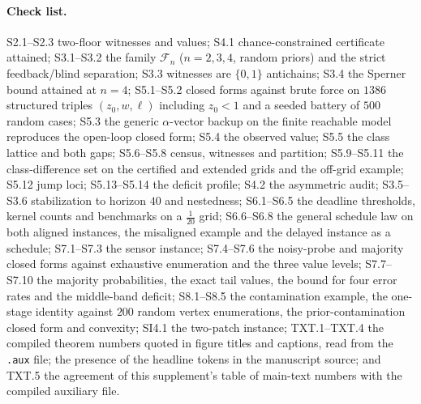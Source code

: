 \documentclass[11pt,a4paper]{article}
\theoremstyle{plain}
\theoremstyle{definition}
\theoremstyle{remark}
\newcommand{\tfr}[2]{\tfrac{#1}{#2}}
\begin{document}
\paragraph{Check list.} S2.1--S2.3 two-floor witnesses and values; S4.1 chance-constrained certificate attained; S3.1--S3.2 the family $\mathcal F_n$ ($n=2,3,4$, random priors) and the strict feedback/blind separation; S3.3 witnesses are $\{0,1\}$ antichains; S3.4 the Sperner bound attained at $n=4$; S5.1--S5.2 closed forms against brute force on $1386$ structured triples $(z_0,w,\ell)$ including $z_0<1$ and a seeded battery of $500$ random cases; S5.3 the generic $\alpha$-vector backup on the finite reachable model reproduces the open-loop closed form; S5.4 the observed value; S5.5 the class lattice and both gaps; S5.6--S5.8 census, witnesses and partition; S5.9--S5.11 the class-difference set on the certified and extended grids and the off-grid example; S5.12 jump loci; S5.13--S5.14 the deficit profile; S4.2 the asymmetric audit; S3.5--S3.6 stabilization to horizon $40$ and nestedness; S6.1--S6.5 the deadline thresholds, kernel counts and benchmarks on a $\tfr1{20}$ grid; S6.6--S6.8 the general schedule law on both aligned instances, the misaligned example and the delayed instance as a schedule; S7.1--S7.3 the sensor instance; S7.4--S7.6 the noisy-probe and majority closed forms against exhaustive enumeration and the three value levels; S7.7--S7.10 the majority probabilities, the exact tail values, the bound for four error rates and the middle-band deficit; S8.1--S8.5 the contamination example, the one-stage identity against $200$ random vertex enumerations, the prior-contamination closed form and convexity; SI4.1 the two-patch instance; TXT.1--TXT.4 the compiled theorem numbers quoted in figure titles and captions, read from the \texttt{.aux} file; the presence of the headline tokens in the manuscript source; and TXT.5 the agreement of this supplement's table of main-text numbers with the compiled auxiliary file.
\end{document}
